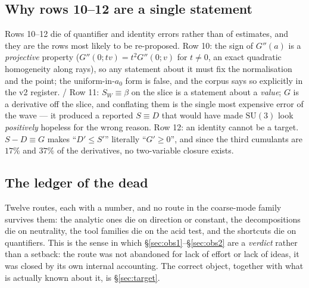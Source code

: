\subsection{Why rows 10--12 are a single statement}

Rows 10--12 die of quantifier and identity errors rather than of estimates, and they are the rows
most likely to be re-proposed. Row 10: the sign of $G''(a)$ is a \emph{projective} property
($G''(0;tv)=t^{2}G''(0;v)$ for $t\ne0$, an exact quadratic homogeneity along rays), so any
statement about it must fix the normalisation and the point; the uniform-in-$a_0$ form is false,
and the corpus says so explicitly in the v2 register. \LT{}/\LN{} Row 11: $S_W\equiv\beta$ on the
slice is a statement about a \emph{value}; $G$ is a derivative off the slice, and conflating them
is the single most expensive error of the wave --- it produced a reported $S\equiv D$ that would
have made $\mathrm{SU}(3)$ look \emph{positively} hopeless for the wrong reason. Row 12: an
identity cannot be a target. $S-D\equiv G$ makes ``$D'\le S'$'' literally ``$G'\ge0$'', and since
the third cumulants are $17\%$ and $37\%$ of the derivatives, no two-variable closure exists.


\subsection{The ledger of the dead}

Twelve routes, each with a number, and no route in the coarse-mode family survives them: the
analytic ones die on direction or constant, the decompositions die on neutrality, the tool
families die on the acid test, and the shortcuts die on quantifiers. This is the sense in which
\S\ref{sec:obs1}--\S\ref{sec:obs2} are a \emph{verdict} rather than a setback: the route was not
abandoned for lack of effort or lack of ideas, it was closed by its own internal accounting. The
correct object, together with what is actually known about it, is \S\ref{sec:target}.
